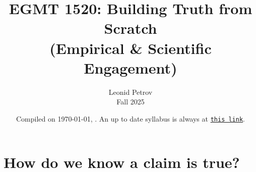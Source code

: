 \documentclass[oneside,11pt]{amsart}
\begin{document}
\title[Building Truth from Scratch]{EGMT 1520: Building Truth from Scratch\\(Empirical \& Scientific Engagement)}
\author{Leonid Petrov\\Fall 2025}
\date{Compiled on \today, \currenttime. An up to date syllabus is always at \href{https://github.com/lenis2000/Syllabi/blob/master/Syllabus_EGMT_f25.pdf}{\texttt{this link}}.}
\maketitle

\bigskip


\section*{How do we know a claim is true?}
\end{document}
